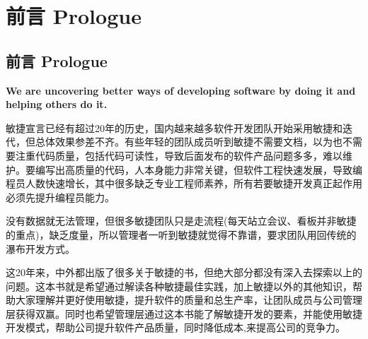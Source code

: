 \chapter*{前言 Prologue} %

\hypertarget{ux524dux8a00-prologue}{%
\section{前言 Prologue}\label{ux524dux8a00-prologue}}

\textbf{We are uncovering better ways of developing software by doing it
and helping others do it.}

\begin{description}
\item[]
\end{description}

敏捷宣言已经有超过20年的历史，国内越来越多软件开发团队开始采用敏捷和迭代，但总体效果参差不齐。有些年轻的团队成员听到敏捷不需要文档，以为也不需要注重代码质量，包括代码可读性，导致后面发布的软件产品问题多多，难以维护。要编写出高质量的代码，人本身能力非常关键，但软件工程快速发展，导致编程员人数快速增长，其中很多缺乏专业工程师素养，所有若要敏捷开发真正起作用必须先提升编程员能力。

没有数据就无法管理，但很多敏捷团队只是走流程(每天站立会议、看板并非敏捷的重点)，缺乏度量，所以管理者一听到敏捷就觉得不靠谱，要求团队用回传统的瀑布开发方式。

这20年来，中外都出版了很多关于敏捷的书，但绝大部分都没有深入去探索以上的问题。这本书就是希望通过解读各种敏捷最佳实践，加上敏捷以外的其他知识，帮助大家理解并更好使用敏捷，提升软件的质量和总生产率，让团队成员与公司管理层获得双赢。同时也希望管理层通过这本书能了解敏捷开发的要素，并能使用敏捷开发模式，帮助公司提升软件产品质量，同时降低成本,来提高公司的竞争力。 


